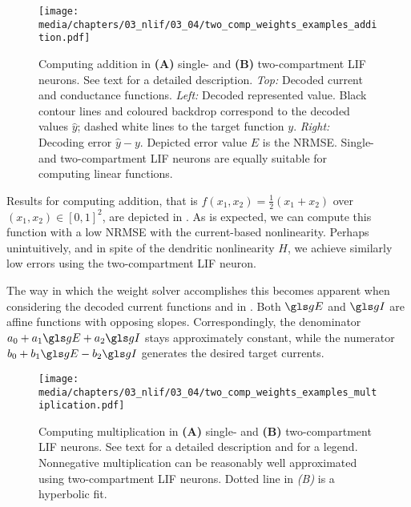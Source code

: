 \begin{figure}
	\centering
	\texttt{[image: media/chapters/03\_nlif/03\_04/two\_comp\_weights\_examples\_addition.pdf]}%
	{\label{fig:two_comp_weights_examples_addition_a}}%
	{\label{fig:two_comp_weights_examples_addition_b}}%
	\caption[Computing addition in single- and two-compartment LIF neurons]{Computing addition in \textbf{(A)} single- and \textbf{(B)} two-compartment LIF neurons. See text for a detailed description. \emph{Top:} Decoded current and conductance functions. \emph{Left:} Decoded represented value. Black contour lines and coloured backdrop correspond to the decoded values $\hat y$; dashed white lines to the target function $y$. \emph{Right:} Decoding error $\hat y - y$. Depicted error value $E$ is the NRMSE.
	Single- and two-compartment LIF neurons are equally suitable for computing linear functions.
	}
	\label{fig:two_comp_weights_examples_addition}
\end{figure}

Results for computing addition, that is $f(x_1, x_2) = \frac{1}2 (x_1 + x_2)$ over $(x_1, x_2) \in [0, 1]^2$, are depicted in .
As is expected, we can compute this function with a low NRMSE with the current-based nonlinearity.
Perhaps unintuitively, and in spite of the dendritic nonlinearity $H$, we achieve similarly low errors using the two-compartment LIF neuron.

The way in which the weight solver accomplishes this becomes apparent when considering the decoded current functions \gE and \gI in .
Both $\gE$ and $\gI$ are affine functions with opposing slopes.
Correspondingly, the denominator $a_0 + a_1 \gE + a_2 \gI$ stays approximately constant, while the numerator $b_0 + b_1 \gE - b_2 \gI$ generates the desired target currents.


\begin{figure}
	\centering
	\texttt{[image: media/chapters/03\_nlif/03\_04/two\_comp\_weights\_examples\_multiplication.pdf]}%
	{\label{fig:two_comp_weights_examples_multiplication_a}}%
	{\label{fig:two_comp_weights_examples_multiplication_b}}%
	\caption[Computing multiplication in single- and two-compartment LIF neurons]{Computing multiplication in \textbf{(A)} single- and \textbf{(B)} two-compartment LIF neurons. See text for a detailed description and  for a legend. Nonnegative multiplication can be reasonably well approximated using two-compartment LIF neurons. Dotted line in \emph{(B)} is a hyperbolic fit.
	}
	\label{fig:two_comp_weights_examples_multiplication}
\end{figure}

